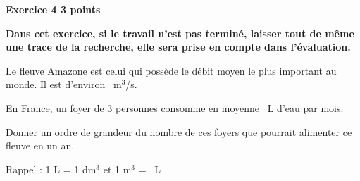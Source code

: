 \textbf{Exercice 4 \hfill 3 points}

\medskip 

\textbf{Dans cet exercice, si le travail n'est pas terminé, laisser tout de même une trace de la recherche, elle sera prise en compte dans l'évaluation.}

\medskip 

Le fleuve Amazone est celui qui possède le débit moyen le plus important au monde. Il est d'environ ~m$^3$/s. 

En France, un foyer de 3 personnes consomme en moyenne ~L d'eau par mois. 

Donner un ordre de grandeur du nombre de ces foyers que pourrait alimenter ce fleuve en un an. 

Rappel : 1 L = 1 dm$^3$ et 1 m$^3$ = ~L 

\bigskip

